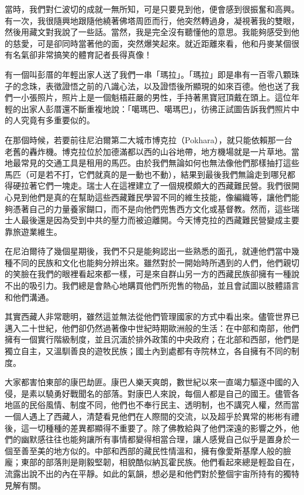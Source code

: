 當時，我們對仁波切的成就一無所知，可是只要見到他，便會感到很振奮和高興。有一次，我很隨興地跟隨他繞著佛塔周匝而行，他突然轉過身，凝視著我的雙眼，然後用藏文對我說了一些話。當然，我是完全沒有聽懂他的意思。我能夠感受到他的慈愛，可是卻同時當著他的面，突然爆笑起來。就近距離來看，他和丹麥某個很有名氣卻非常搞笑的體育記者長得真像！

有一個叫彭厝的年輕出家人送了我們一串「瑪拉」。「瑪拉」即是串有一百零八顆珠子的念珠，表徵證悟之前的八識心法，以及證悟後所顯現的如來百德。他也送了我們一小張照片，照片上是一個魁梧莊嚴的男性，手持著黑寶冠頂戴在頭上。這位年輕的出家人彭厝還不斷重複地說：「噶瑪巴、噶瑪巴」，彷彿正試圖告訴我們照片中的人究竟有多重要似的。

在那個時候，若要前往尼泊爾第二大城市博克拉（Pokhara），就只能依賴那一台老舊的轟炸機。博克拉位於加德滿都以西的山谷地帶，地方機場就是一片草地。當地最常見的交通工具是租用的馬匹。由於我們無論如何也無法像他們那樣抽打這些馬匹（可是若不打，它們就真的是一動也不動），結果到最後我們無論走到哪兒都得硬拉著它們一塊走。瑞士人在這裡建立了一個規模頗大的西藏難民營。我們很開心見到他們是真的在幫助這些西藏難民學習不同的維生技能，像編織等，讓他們能夠憑著自己的力量養家餬口，而不是向他們兜售西方文化或基督教。然而，這些瑞士人最後還是因為受到中共的壓力而被迫離開。今天博克拉的西藏難民營變成主要靠旅遊業維生。

在尼泊爾待了幾個星期後，我們不只是能夠認出一些熟悉的面孔，就連他們當中幾種不同的民族和文化也能夠分辨出來。雖然對於一開始時所遇到的人們，他們親切的笑臉在我們的眼裡看起來都一樣，可是來自群山另一方的西藏民族卻擁有一種說不出的吸引力。我們總是會熱心地購買他們所兜售的物品，並且會試圖以肢體語言和他們溝通。

其實西藏人非常聰明，雖然這並無法從他們管理國家的方式中看出來。儘管世界已邁入二十世紀，他們卻仍然過著像中世紀時期歐洲般的生活：在中部和南部，他們擁有一個實行階級制度，並且沉湎於排外政策的中央政府；在北部和西部，他們是獨立自主，又溫馴善良的遊牧民族；國土內到處都有寺院林立，各自擁有不同的制度。

大家都害怕東部的康巴劫匪。康巴人樂天爽朗，數世紀以來一直竭力驅逐中國的入侵，是素以驍勇好戰聞名的部落。對康巴人來說，每個人都是自己的國王。儘管各地區的民俗風情、制度不同，他們也不奉行民主、透明制，也不講究人權，然而當一個人遇上了西藏人，清楚看見他們在人際間的交流，以及超乎於異常的彬彬有禮後，這一切種種的差異都顯得不重要了。除了佛教給與了他們深遠的影響之外，他們的幽默感往往也能夠讓所有事情都變得相當合理，讓人感覺自己似乎是置身於一個至善至美的地方似的。中部和西部的藏民性情溫和，擁有像愛斯基摩人般的臉龐；東部的部落則是剛毅堅韌，相貌酷似納瓦霍民族。他們看起來總是輕盈自在，流露出說不出的內在平靜。如此的氣韻，想必是和他們對於整個宇宙所持有的獨特見解有關。

